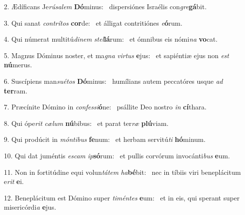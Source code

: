 2. Ædíficans Je\textit{rú}\textit{sa}\textit{lem} \textbf{Dó}minus: \ast\  dispersiónes Israélis con\textit{gre}\textbf{gá}bit.\

3. Qui sanat \textit{con}\textit{trí}\textit{tos} \textbf{cor}de: \ast\  et álligat contritiónes \textit{e}\textbf{ó}rum.\

4. Qui númerat multitú\textit{di}\textit{nem} \textit{stel}\textbf{lá}rum: \ast\  et ómnibus eis nómi\textit{na} \textbf{vo}cat.\

5. Magnus Dóminus noster, et ma\textit{gna} \textit{vir}\textit{tus} \textbf{e}jus: \ast\  et sapiéntiæ ejus non \textit{est} \textbf{nú}merus.\

6. Suscípiens man\textit{su}\textit{é}\textit{tos} \textbf{Dó}minus: \ast\  humílians autem peccatóres usque \textit{ad} \textbf{ter}ram.\

7. Præcínite Dómino in \textit{con}\textit{fes}\textit{si}\textbf{ó}ne: \ast\  psállite Deo nostro \textit{in} \textbf{cí}thara.\

8. Qui ópe\textit{rit} \textit{cæ}\textit{lum} \textbf{nú}bibus: \ast\  et parat ter\textit{ræ} \textbf{plú}viam.\

9. Qui prodúcit in \textit{món}\textit{ti}\textit{bus} \textbf{fe}num: \ast\  et herbam servitú\textit{ti} \textbf{hó}minum.\

10. Qui dat juméntis \textit{es}\textit{cam} \textit{ip}\textbf{só}rum: \ast\  et pullis corvórum invocánti\textit{bus} \textbf{e}um.\

11. Non in fortitúdine equi volun\textit{tá}\textit{tem} \textit{ha}\textbf{bé}bit: \ast\  nec in tíbiis viri beneplácitum e\textit{rit} \textbf{e}i.\

12. Beneplácitum est Dómino super \textit{ti}\textit{mén}\textit{tes} \textbf{e}um: \ast\  et in eis, qui sperant super misericórdi\textit{a} \textbf{e}jus.\

